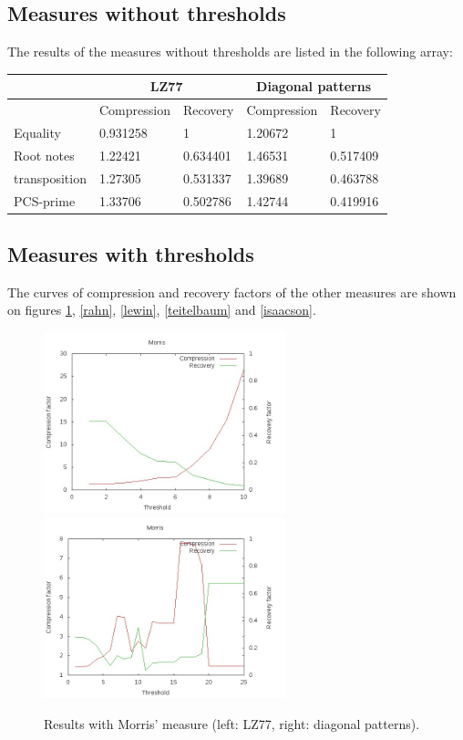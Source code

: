 \documentclass[a4paper,10pt]{article}
\begin{document}
\subsection*{Measures without thresholds}

The results of the measures without thresholds are listed in the following array: \\

\begin{tabular}{|l|l|l|l|l|}
\hline
            & \multicolumn{2}{|c|}{\textbf{LZ77}}& \multicolumn{2}{|c|}{\textbf{Diagonal patterns}}\\ \hline
            & Compression & Recovery & Compression       & Recovery \\ \hline
Equality    & 0.931258    & 1        & 1.20672           & 1        \\ \hline
Root notes  & 1.22421     & 0.634401 & 1.46531           & 0.517409 \\ \hline
transposition & 1.27305     & 0.531337 & 1.39689           & 0.463788 \\ \hline
PCS-prime   & 1.33706     & 0.502786 & 1.42744           & 0.419916 \\ \hline
\end{tabular}

\newpage
\subsection*{Measures with thresholds}

The curves of compression and recovery factors of the other measures are shown on figures \ref{morris}, \ref{rahn}, \ref{lewin}, \ref{teitelbaum} and \ref{isaacson}.

\begin{figure}[h!]
\centering
\includegraphics[width=7cm]{images/Morris77.jpg}\hspace{0.5cm}
\includegraphics[width=7cm]{images/MorrisDiag.jpg}
\caption{Results with Morris' measure (left: LZ77, right: diagonal patterns).\label{morris}}
\end{figure}
\end{document}
